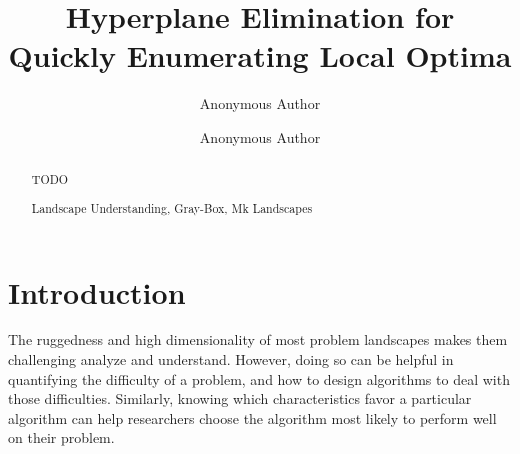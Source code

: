 \documentclass[runningheads,a4paper]{llncs}
\newcommand{\keywords}[1]{\par\addvspace\baselineskip
\noindent\keywordname\enspace\ignorespaces#1}
\begin{document}
\mainmatter  %

\title{Hyperplane Elimination for Quickly Enumerating Local Optima}


%
%
\author{Anonymous Author\and Anonymous Author}

%


%
%

\maketitle


\begin{abstract}
TODO

\keywords{Landscape Understanding, Gray-Box, Mk Landscapes}
\end{abstract}


\section{Introduction}
The ruggedness and high dimensionality of most problem landscapes makes them challenging
analyze and understand. However, doing so can be helpful in
quantifying the difficulty of a problem, and how to design algorithms to deal
with those difficulties. 
Similarly, knowing which characteristics favor
a particular
algorithm can help researchers choose the algorithm
most likely to perform well on their problem.
\end{document}
